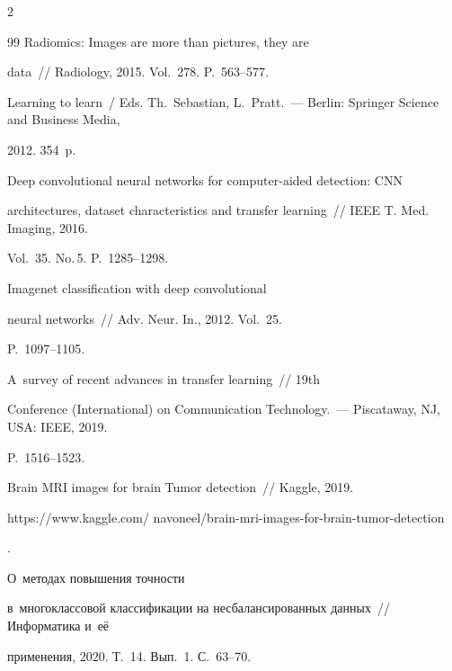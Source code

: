 \begin{multicols}{2}
{{\begin{thebibliography}{99}
 Radiomics: Images are more than pictures, they are 

data~// Radiology, 2015. Vol.~278. P.~563--577.


Learning to learn~/ Eds. Th.~Sebastian, L.~Pratt.~--- Berlin: Springer Science and Business Media, 

2012. 354~p.


 Deep convolutional neural networks for computer-aided detection: CNN 

architectures, dataset characteristics and transfer learning~// IEEE T. Med. Imaging, 2016. 

Vol.~35. No.\,5. P.~1285--1298.

{



}


 Imagenet classification with deep convolutional 

neural networks~// Adv. Neur. In., 2012. Vol.~25.  

P.~1097--1105.


 A~survey of recent advances in transfer learning~// 19th  

Conference (International) on Communication Technology.~--- Piscataway, NJ, USA: IEEE, 2019. 

P.~1516--1523.


 Brain MRI images for brain Tumor detection~// Kaggle, 2019. {\sf 

https://www.kaggle.com/ navoneel/brain-mri-images-for-brain-tumor-detection}.


 О~методах повышения точности 

в~многоклассовой классификации на несбалансированных данных~// Информатика и~её 

применения, 2020. Т.~14. Вып.~1. С.~63--70. 



\end{thebibliography}}}
\end{multicols}
